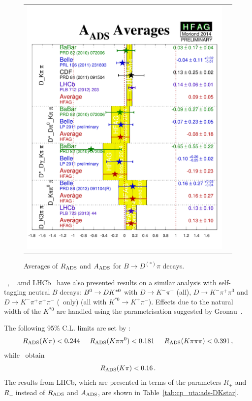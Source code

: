 \begin{figure}[htb]
\begin{center}
\begin{tabular}{cc}
{        \includegraphics{figures/cp_uta/A_ADS_Dpi}
      }
    \end{tabular}
  \end{center}
  \vspace{-0.8cm}
  \caption{
    Averages of $R_{\rm ADS}$ and $A_{\rm ADS}$ for $B \to D^{(*)}\pi$ decays.
  }
  \label{fig:cp_uta:cus:ads-Dpi}
\end{figure}

\babar~\cite{:2009au}, \belle~\cite{Negishi:2012uxa} amd LHCb~\cite{Aaij:2014eha} have also presented results on a similar analysis with self-tagging neutral $B$ decays: $B^0 \to DK^{*0}$ with $D \to K^-\pi^+$ (all), 
$D \to K^-\pi^+\pi^0$ and $D \to K^-\pi^+\pi^+\pi^-$ (\babar\ only)
(all with $K^{*0} \to K^+\pi^-$). 
Effects due to the natural width of the $K^{*0}$ are
handled using the parametrisation suggested by Gronau~\cite{Gronau:2002mu}. 

The following 95\% C.L. limits are set by \babar:
\begin{equation}
  R_{\rm ADS}(K\pi) < 0.244 \hspace{5mm}
  R_{\rm ADS}(K\pi\pi^0) < 0.181 \hspace{5mm}
  R_{\rm ADS}(K\pi\pi\pi) < 0.391 \, ,
\end{equation}
while \belle\ obtain
\begin{equation}
  R_{\rm ADS}(K\pi) < 0.16 \, .
\end{equation}
The results from LHCb, which are presented in terms of the parameters $R_+$ and $R_-$ instead of $R_{\rm ADS}$ and $A_{\rm ADS}$, are shown in Table~\ref{tab:cp_uta:ads-DKstar}.

